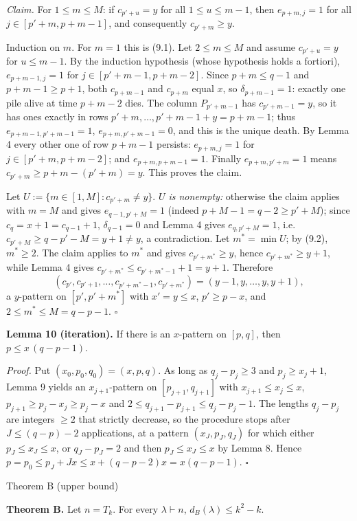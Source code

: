 \emph{Claim.} For \(1\le m\le M\): if \(c_{p'+u}=y\) for all
\(1\le u\le m-1\), then \(e_{p+m,j}=1\) for all \(j\in[p'+m,p+m-1]\),
and consequently \(c_{p'+m}\ge y\).

Induction on \(m\). For \(m=1\) this is (9.1). Let \(2\le m\le M\) and
assume \(c_{p'+u}=y\) for \(u\le m-1\). By the induction hypothesis
(whose hypothesis holds a fortiori), \(e_{p+m-1,j}=1\) for
\(j\in[p'+m-1,p+m-2]\). Since \(p+m\le q-1\) and \(p+m-1\ge p+1\), both
\(c_{p+m-1}\) and \(c_{p+m}\) equal \(x\), so \(\delta_{p+m-1}=1\):
exactly one pile alive at time \(p+m-2\) dies. The column \(P_{p'+m-1}\)
has \(c_{p'+m-1}=y\), so it has ones exactly in rows
\(p'+m,\dots,p'+m-1+y=p+m-1\); thus \(e_{p+m-1,p'+m-1}=1\),
\(e_{p+m,p'+m-1}=0\), and this is the unique death. By Lemma 4 every
other one of row \(p+m-1\) persists: \(e_{p+m,j}=1\) for
\(j\in[p'+m,p+m-2]\); and \(e_{p+m,p+m-1}=1\). Finally
\(e_{p+m,p'+m}=1\) means \(c_{p'+m}\ge p+m-(p'+m)=y\). This proves the
claim.

Let \(U:=\{m\in[1,M]:c_{p'+m}\ne y\}\). \emph{\(U\) is nonempty:}
otherwise the claim applies with \(m=M\) and gives \(e_{q-1,p'+M}=1\)
(indeed \(p+M-1=q-2\ge p'+M\)); since \(c_q=x+1=c_{q-1}+1\),
\(\delta_{q-1}=0\) and Lemma 4 gives \(e_{q,p'+M}=1\),
i.e.~\(c_{p'+M}\ge q-p'-M=y+1\ne y\), a contradiction. Let
\(m^*=\min U\); by (9.2), \(m^*\ge2\). The claim applies to \(m^*\) and
gives \(c_{p'+m^*}\ge y\), hence \(c_{p'+m^*}\ge y+1\), while Lemma 4
gives \(c_{p'+m^*}\le c_{p'+m^*-1}+1=y+1\). Therefore
\[(c_{p'},c_{p'+1},\dots,c_{p'+m^*-1},c_{p'+m^*})=(y-1,y,\dots,y,y+1),\]
a \(y\)-pattern on \([p',p'+m^*]\) with \(x'=y\le x\), \(p'\ge p-x\),
and \(2\le m^*\le M=q-p-1\). \(\square\)

\textbf{Lemma 10 (iteration).} If there is an \(x\)-pattern on
\([p,q]\), then \(p\le x\,(q-p-1)\).

\emph{Proof.} Put \((x_0,p_0,q_0)=(x,p,q)\). As long as \(q_j-p_j\ge3\)
and \(p_j\ge x_j+1\), Lemma 9 yields an \(x_{j+1}\)-pattern on
\([p_{j+1},q_{j+1}]\) with \(x_{j+1}\le x_j\le x\),
\(p_{j+1}\ge p_j-x_j\ge p_j-x\) and
\(2\le q_{j+1}-p_{j+1}\le q_j-p_j-1\). The lengths \(q_j-p_j\) are
integers \(\ge2\) that strictly decrease, so the procedure stops after
\(J\le (q-p)-2\) applications, at a pattern \((x_J,p_J,q_J)\) for which
either \(p_J\le x_J\le x\), or \(q_J-p_J=2\) and then
\(p_J\le x_J\le x\) by Lemma 8. Hence
\(p=p_0\le p_J+Jx\le x+(q-p-2)x=x(q-p-1)\). \(\square\)

Theorem B (upper bound)

\textbf{Theorem B.} Let \(n=T_k\). For every \(\lambda\vdash n\),
\(d_B(\lambda)\le k^2-k\).


